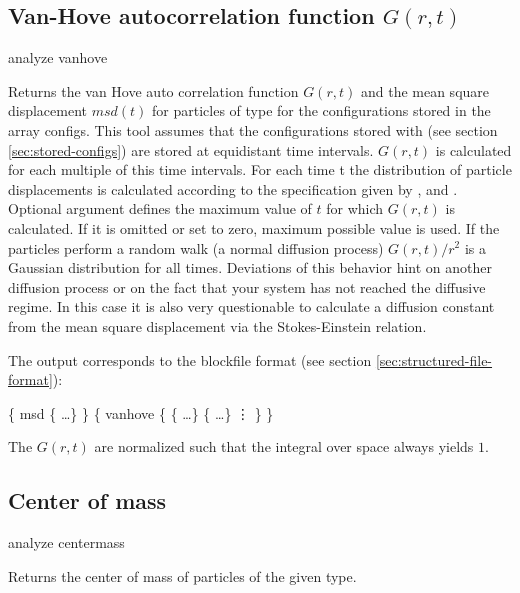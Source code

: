 \subsection{Van-Hove autocorrelation function $G(r,t)$}
\label{analyze:vanhove}
\begin{essyntax}
  analyze vanhove    
\end{essyntax}
Returns the van Hove auto correlation function $G(r,t)$ and the mean
square displacement $msd(t)$ for particles of type  for the
configurations stored in the array configs. This tool assumes that the
configurations stored with  (see section
\vref{sec:stored-configs}) are stored at equidistant time intervals.
$G(r,t)$ is calculated for each multiple of this time intervals. For
each time t the distribution of particle displacements is calculated
according to the specification given by ,  and
. Optional argument  defines the maximum value
of $t$ for which $G(r,t)$ is calculated. If it is omitted or set to
zero, maximum possible value is used.
If the particles perform a random walk (\ie a normal
diffusion process) $G(r,t)/r^2$ is a Gaussian distribution for all
times.  Deviations of this behavior hint on another diffusion process
or on the fact that your system has not reached the diffusive regime.
In this case it is also very questionable to calculate a diffusion
constant from the mean square displacement via the Stokes-Einstein
relation. 

The output corresponds to the blockfile format (see section
\vref{sec:structured-file-format}):
\begin{code}
\{ msd \{   \dots \} \} 
\{ vanhove \{ \{   \dots \} 
            \{   \dots \}
\vdots
          \}
\}
\end{code}

The $G(r,t)$ are normalized such that the integral over space always
yields $1$.

\subsection{Center of mass}
\label{analyze:centermass}
\begin{essyntax}
  analyze centermass 
\end{essyntax}
Returns the center of mass of particles of the given type.

